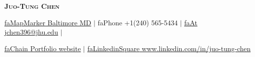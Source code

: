 \documentclass[a4paper, 11pt]{article}
\newcommand{\seticon}[1]{\textcolor{myblue}{\csname #1\endcsname}}
\begin{document}

\begin{center}
    \textbf{\huge \scshape Juo-Tung Chen} \\ \vspace{13pt}

    

    \href{https://}{{\seticon{faMapMarker} Baltimore MD}} $|$ \small {\seticon{faPhone} +1(240) 565-5434 }   $|$ \href{mailto:jchen396@jhu.edu}{ \seticon{faAt} \underline{jchen396@jhu.edu}} $|$ 
    
    \href{https://jjcc0704.wixsite.com/projects}{\seticon{faChain} \underline{ {Portfolio website}}} $|$ 
    \href{www.linkedin.com/in/juo-tung-chen/}{\seticon{faLinkedinSquare} \underline{ www.linkedin.com/in/juo-tung-chen}}




\end{center}
\end{document}
